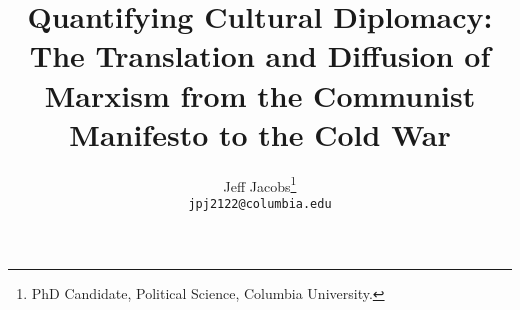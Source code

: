 \documentclass[12pt]{report}   %
\begin{document}
\title{Quantifying Cultural Diplomacy: The Translation and Diffusion of Marxism from the Communist Manifesto to the Cold War}
\author{Jeff Jacobs\thanks{PhD Candidate, Political Science, Columbia University.}\\\texttt{jpj2122@columbia.edu}}

\maketitle

\setcounter{chapter}{2}


\end{document}
